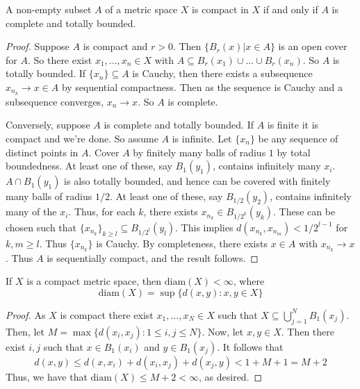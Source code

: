 \begin{theorem}
    A non-empty subset $A$ of a metric space $X$ is compact in $X$ if and only if $A$ is complete and totally bounded.
\end{theorem}
\begin{proof}
    Suppose $A$ is compact and $r>0$. Then $\{B_r(x)\vert x \in A\}$ is an open cover for $A$. So there exist $x_1,...,x_n \in X$ with $A \subseteq B_r(x_1)\cup ... \cup B_r(x_n)$. So $A$ is totally bounded. If $\{x_n\} \subseteq A$ is Cauchy, then there exists a subsequence $x_{n_k}\rightarrow x \in A$ by sequential compactness. Then as the sequence is Cauchy and a subsequence converges, $x_n\rightarrow x$. So $A$ is complete. 

    Conversely, suppose $A$ is complete and totally bounded. If $A$ is finite it is compact and we're done. So assume $A$ is infinite. Let $\{x_n\}$ be any sequence of distinct points in $A$. Cover $A$ by finitely many balls of radius $1$ by total boundedness. At least one of these, say $B_1(y_1)$, contains infinitely many $x_i$. $A \cap B_1(y_1)$ is also totally bounded, and hence can be covered with finitely many balls of radius $1/2$. At least one of these, say $B_{1/2}(y_2)$, contains infinitely many of the $x_i$. Thus, for each $k$, there exists $x_{n_k} \in B_{1/2^k}(y_k)$. These can be chosen such that $\{x_{n_k}\}_{k\geq l} \subseteq B_{1/2^l}(y_l)$. This implies $d(x_{n_k},x_{n_m}) < 1/2^{l-1}$ for $k,m \geq l$. Thus $\{x_{n_k}\}$ is Cauchy. By completeness, there exists $x \in A$ with $x_{n_k}\rightarrow x$. Thus $A$ is sequentially compact, and the result follows.
\end{proof}


\begin{proposition}\label{prop:2.3.8}
    If $X$ is a compact metric space, then $\text{diam}(X) < \infty$, where \begin{equation*}
        \text{diam}(X) = \sup\{d(x,y):x,y \in X\}
    \end{equation*}
\end{proposition}
\begin{proof}
     As $X$ is compact there exist $x_1,...,x_N \in X$ such that $X \subseteq \bigcup_{j=1}^NB_1(x_j)$. Then, let $M = \max\{d(x_i,x_j):1\leq i,j\leq N\}$. Now, let $x,y \in X$. Then there exist $i,j$ such that $x \in B_1(x_i)$ and $y \in B_1(x_j)$. It follows that $$d(x,y) \leq d(x,x_i) + d(x_i,x_j) + d(x_j,y) < 1+M+1 = M+2$$ Thus, we have that $\text{diam}(X) \leq M+2 < \infty$, as desired.
\end{proof}


